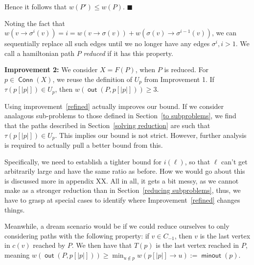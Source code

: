 \documentclass{article}
\DeclareMathOperator{\minout}{\bm{\mathsf{minout}}}
\DeclareMathOperator{\out}{\bm{\mathsf{out}}}
\DeclareMathOperator{\Conn}{\bm{\mathsf{Conn}}}
\newcommand{\hide}[1]{}
\newcommand{\edit}[1]{}%
\begin{document}
Hence it follows that $w(P') \leq w(P)$. $\blacksquare$

Noting the fact that $w(v \to \sigma^i(v)) = i = w(v \to \sigma(v)) + w(\sigma(v)\to \sigma^{i-1}(v))$, we can sequentially replace all such edges until we no longer have any edges $\sigma^i, i > 1$. We call a hamiltonian path $P$ \textit{reduced} if it has this property.\edit{ use the word reduced a lot}

\textbf{Improvement 2:} \label{refined} We consider $X = F(P)$, when $P$ is reduced. For $p \in \Conn(X)$, we reuse the definition of $U_p$ from Improvement 1. If $\tau(p[|p|]) \in U_p$, then $w(\out(P,p[|p|])) \geq 3$.

Using improvement~\ref{refined} actually improves our bound. If we consider analagous sub-problems to those defined in Section~\ref{to subproblems}, we find that the paths described in Section~\ref{solving reduction} are such that $\tau(p[|p|]) \in U_p$. This implies our bound is not strict. However, further analysis is required to actually pull a better bound from this. 

Specifically, we need to establish a tighter bound for $i(\ell)$, so that $\ell$ can't get arbitrarily large and have the same ratio as before. How we would go about this is discussed more in appendix XX.\edit{ insert this in somewhere} All in all, it gets a bit messy, as we cannot make as a stronger reduction than in Section~\ref{reducing subproblems}, thus, we have to grasp at special cases to identify where Improvement~\ref{refined} changes things.\edit{ clarify}

\hide{
Unfortunately, improvement 2 is still not sufficient to improve the lower bound. Solving analagous subproblems to those established in 5.1, we may reuse the solutions provided in 5.3 to get the same bound. (however, we now have that $\ell_1$ now has only one solution, as the larger values now have an additional weight)}

Meanwhile, a dream scenario would be if we could reduce ourselves to only considering paths with the following property: if $v \in C_{-1}$, then $v$ is the last vertex in $c(v)$ reached by $P$. We then have that $T(p)$ is the last vertex reached in $P$, meaning $w(\out(P,p[|p|])) \geq \min_{u\not \in p} w(p[|p|] \to u) := \minout(p)$.
\end{document}
